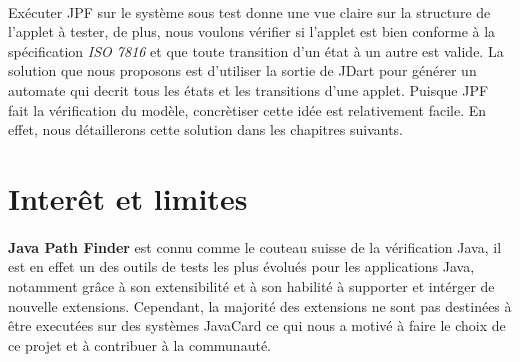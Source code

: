 		\paragraph{}
			Exécuter \gls{JPF} sur le système sous test donne une vue claire sur la structure de l'applet à tester, de plus, nous voulons
			vérifier si l'applet est bien conforme à la spécification \textit{ISO 7816} et que toute transition d'un état à un autre est valide.
			La solution que nous proposons est d'utiliser la sortie de JDart pour générer un automate qui decrit tous les états et les transitions
			d'une applet.
			Puisque \gls{JPF} fait la vérification du modèle, concrètiser cette idée est relativement facile.
			En effet, nous détaillerons cette solution dans les chapitres suivants.
			
	\section{Interêt et limites}
	\paragraph{}
		\textbf{Java Path Finder} est connu comme le couteau suisse de la vérification Java,
		il est en effet un des outils de tests les plus évolués pour les applications Java,
		notamment grâce à son extensibilité et à son habilité à supporter et intérger de nouvelle extensions.
		Cependant, la majorité des extensions ne sont pas destinées à être executées sur des systèmes JavaCard ce qui nous a motivé
		à faire le choix de ce projet et à contribuer à la communauté.